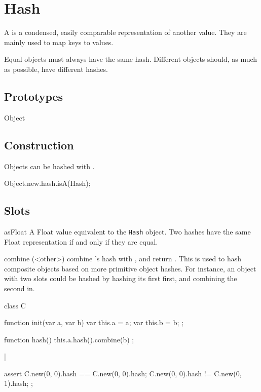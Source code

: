 
\section{Hash}

A  is a condensed, easily comparable representation of
another value. They are mainly used to map  keys
to values.

Equal objects must always have the same hash. Different objects
should, as much as possible, have different hashes.

\subsection{Prototypes}
\begin{refObjects}
\item[Object]
\end{refObjects}

\subsection{Construction}
Objects can be hashed with .
\begin{urbiassert}
Object.new.hash.isA(Hash);
\end{urbiassert}

\subsection{Slots}
\begin{urbiscriptapi}
\item[asFloat] A Float value equivalent to the \lstinline|Hash|
  object. Two hashes have the same Float representation if and only if
  they are equal.
\item[combine](<other>) combine 's hash with ,
  and return . This is used to hash composite objects based
  on more primitive object hashes. For instance, an object with two
  slots could be hashed by hashing its first first, and combining the
  second in.

\begin{urbiscript}
class C
{
  function init(var a, var b)
  {
    var this.a = a;
    var this.b = b;
  };

  function hash()
  {
    this.a.hash().combine(b)
  };
}|

assert
{
  C.new(0, 0).hash == C.new(0, 0).hash;
  C.new(0, 0).hash != C.new(0, 1).hash;
};
\end{urbiscript}
\end{urbiscriptapi}
